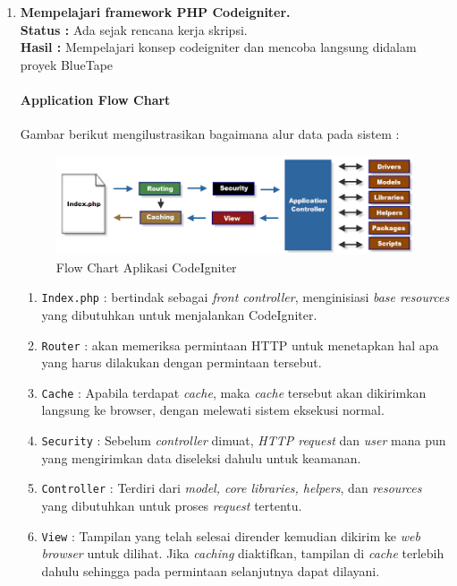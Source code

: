 \documentclass[a4paper,twoside]{article}
\begin{document}
	\begin{enumerate}
		\item \textbf{Mempelajari framework PHP Codeigniter.}\\
		{\bf Status :} Ada sejak rencana kerja skripsi.\\
		{\bf Hasil :} Mempelajari konsep codeigniter dan mencoba langsung didalam proyek BlueTape \par
		\paragraph{Application Flow Chart} \par
		Gambar berikut mengilustrasikan bagaimana alur data pada sistem :
		
		\begin{figure} [H]
			\centering  
			\includegraphics[scale=1.0]{appflowchart.png}  
			\caption{Flow Chart Aplikasi CodeIgniter}
			\label{fig:flow-chart-CodeIgniter} 
		\end{figure}
		
		\begin{enumerate}
			\item \texttt{Index.php} : bertindak sebagai \textit{front controller}, menginisiasi \textit{base resources} yang dibutuhkan untuk menjalankan CodeIgniter.
			\item \texttt{Router} : akan memeriksa permintaan HTTP untuk menetapkan hal apa yang harus dilakukan dengan permintaan tersebut.
			\item \texttt{Cache} : Apabila terdapat \textit{cache}, maka \textit{cache} tersebut akan dikirimkan langsung ke browser, dengan melewati sistem eksekusi normal.
			\item \texttt{Security} : Sebelum \textit{controller} dimuat, \textit{HTTP request} dan \textit{user} mana pun yang mengirimkan data diseleksi dahulu untuk keamanan.
			\item \texttt{Controller} : Terdiri dari \textit{model, core libraries, helpers}, dan \textit{resources} yang dibutuhkan untuk proses \textit{request} tertentu.
			\item \texttt{View} : Tampilan yang telah selesai dirender kemudian dikirim ke \textit{web browser} untuk dilihat. Jika \textit{caching} diaktifkan, tampilan di \textit{cache} terlebih dahulu sehingga pada permintaan selanjutnya dapat dilayani.\cite{codeigniter}
		\end{enumerate}
		

\end{enumerate}
\end{document}
